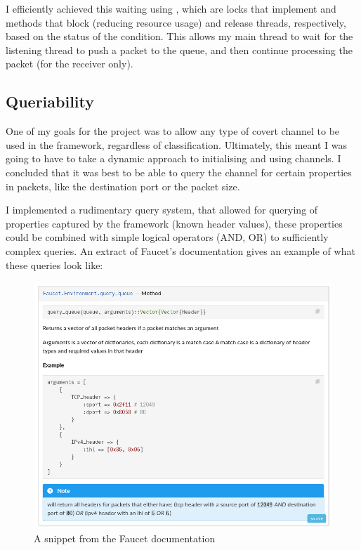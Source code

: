 I efficiently achieved this waiting using , which are locks that implement  and  methods that block (reducing resource usage) and release threads, respectively, based on the status of the condition. This allows my main thread to wait for the listening thread to push a packet to the queue, and then continue processing the packet (for the receiver only).

\subsection{Queriability}
\label{sec:queriability}

One of my goals for the project was to allow any type of covert channel to be used in the framework, regardless of classification. Ultimately, this meant I was going to have to take a dynamic approach to initialising and using channels. I concluded that it was best to be able to query the channel for certain properties in packets, like the destination port or the packet size.

I implemented a rudimentary query system, that allowed for querying of properties captured by the framework (known header values), these properties could be combined with simple logical operators (AND, OR) to sufficiently complex queries. An extract of Faucet's documentation gives an example of what these queries look like:

\begin{figure}[!h]
    \centering
    \includegraphics[width=\textwidth]{fig/docs_query_queue.png}
    \caption{A snippet from the Faucet documentation}
    \label{fig:doc_snippet}
\end{figure}

